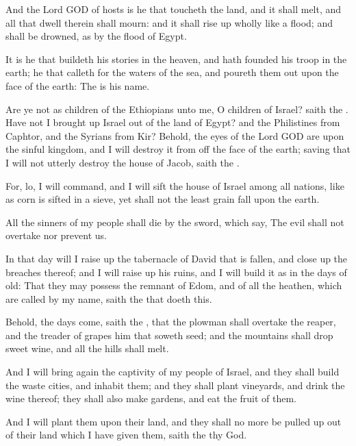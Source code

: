 \Verse And the Lord GOD of hosts is he that toucheth the land, and it shall melt, and all that dwell therein shall mourn: and it shall rise up wholly like a flood; and shall be drowned, as by the flood of Egypt.

\Verse It is he that buildeth his stories in the heaven, and hath founded his troop in the earth; he that calleth for the waters of the sea, and poureth them out upon the face of the earth: The \LORD is his name.

\Verse Are ye not as children of the Ethiopians unto me, O children of Israel? saith the \LORD. Have not I brought up Israel out of the land of Egypt? and the Philistines from Caphtor, and the Syrians from Kir?  \Verse Behold, the eyes of the Lord GOD are upon the sinful kingdom, and I will destroy it from off the face of the earth; saving that I will not utterly destroy the house of Jacob, saith the \LORD.

\Verse For, lo, I will command, and I will sift the house of Israel among all nations, like as corn is sifted in a sieve, yet shall not the least grain fall upon the earth.

\Verse All the sinners of my people shall die by the sword, which say, The evil shall not overtake nor prevent us.

\Verse In that day will I raise up the tabernacle of David that is fallen, and close up the breaches thereof; and I will raise up his ruins, and I will build it as in the days of old: \Verse That they may possess the remnant of Edom, and of all the heathen, which are called by my name, saith the \LORD that doeth this.

\Verse Behold, the days come, saith the \LORD, that the plowman shall overtake the reaper, and the treader of grapes him that soweth seed; and the mountains shall drop sweet wine, and all the hills shall melt.

\Verse And I will bring again the captivity of my people of Israel, and they shall build the waste cities, and inhabit them; and they shall plant vineyards, and drink the wine thereof; they shall also make gardens, and eat the fruit of them.

\Verse And I will plant them upon their land, and they shall no more be pulled up out of their land which I have given them, saith the \LORD thy God.

